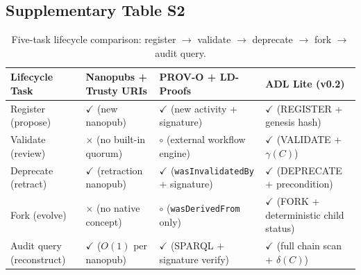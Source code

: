 \subsection{Supplementary Table S2}\label{tab:S2}
\begin{table}[htbp]
\centering
\small
\caption{Five-task lifecycle comparison: register $\to$ validate $\to$ deprecate $\to$ fork $\to$ audit query.}
\label{tab:lifecycle-comparison}
\begin{tabularx}{\textwidth}{@{}p{3.2cm}XXX@{}}
\toprule
\textbf{Lifecycle Task} & \textbf{Nanopubs + Trusty URIs} & \textbf{PROV-O + LD-Proofs} & \textbf{ADL Lite (v0.2)} \\
\midrule
Register (propose) & $\checkmark$ (new nanopub) & $\checkmark$ (new activity + signature) & $\checkmark$ (\textsc{REGISTER} + genesis hash) \\
Validate (review) & $\times$ (no built-in quorum) & $\circ$ (external workflow engine) & $\checkmark$ (\textsc{VALIDATE} + $\gamma(C)$) \\
Deprecate (retract) & $\checkmark$ (retraction nanopub) & $\checkmark$ (\texttt{wasInvalidatedBy} + signature) & $\checkmark$ (\textsc{DEPRECATE} + precondition) \\
Fork (evolve) & $\times$ (no native concept) & $\circ$ (\texttt{wasDerivedFrom} only) & $\checkmark$ (\textsc{FORK} + deterministic child status) \\
Audit query (reconstruct) & $\checkmark$ ($O(1)$ per nanopub) & $\checkmark$ (SPARQL + signature verify) & $\checkmark$ (full chain scan + $\delta(C)$) \\
\bottomrule
\end{tabularx}
\end{table}

